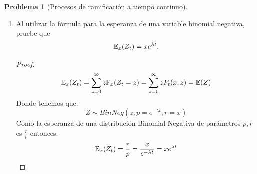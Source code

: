 \documentclass[a5paper,oneside]{amsart}
\theoremstyle{plain}
\theoremstyle{definition}
\newtheorem{problema}{Problema}
\begin{document}
\begin{problema}[Procesos de ramificaci\'on a tiempo continuo]
\begin{enumerate}
\begin{proof}
$$
e^{\lambda xt}P_t(x,x+1)=\int_0^t\lambda x e^{-\lambda s}ds=x(1-e^{\lambda t})$$
De donde encontramos que:
$$
P_t(x,x+1)=xe^{-\lambda xt}(1-e^{\lambda t})=\binom{x}{1} e^{-\lambda x t}\paren{1-e^{-\lambda t}}^{x+1-x}
$$
Por lo tanto la igualdad es v\'alida para $k=1$, ahora supongamos valida para $y=x+k$ y la demostraremos para $y=x+k+1$
$$
\frac{d}{dt}\imf{P_t}{x,x+k+1}=\lambda x P_t(x+1,x+k+1)-\lambda x P_t(x,x+k+1)
$$
Por la hip\'otesis de inducci\'on:
$$
P_t(x+1,x+k+1)=P_t((x+1),(x+1)+k)=\binom{x+k}{k} e^{-\lambda (x+1) t}\paren{1-e^{-\lambda t}}^{k}.
$$
Entonces:
$$
\frac{d}{dt}\imf{P_t}{x,x+k+1}=\lambda x \binom{x+k}{k} e^{-\lambda (x+1) t}\paren{1-e^{-\lambda t}}^{k}-\lambda x P_t(x,x+k+1)
$$
Nuevamente haciendo uso de la t\'ecnica del factor integrante (multiplicamos por $e^{\lambda xt}$) obtenemos la siguiente ecuaci\'on diferencial:
$$
\frac{d}{dt}\paren{e^{\lambda xt} \imf{P_t}{x,x+k+1}}=\lambda x \binom{x+k}{k} e^{-\lambda t}\paren{1-e^{-\lambda t}}^{k}
$$
Resolviendo la ecuaci\'on integrando 
$$
\paren{e^{\lambda xt} \imf{P_t}{x,x+k+1}}=\int_0^t\lambda x \binom{x+k}{k} e^{-\lambda s}\paren{1-e^{-\lambda s}}^{k}ds
$$
Obtenemos:
$$
\imf{P_t}{x,x+k+1}=\frac{x}{k+1}\binom{x+k}{k}e^{-\lambda xt} \paren{1-e^{-\lambda t}}^{k+1}
$$
Finalmente como:
$$
\frac{x}{k+1}\binom{x+k}{k}=\frac{x(x+k)!}{(k+1)x!k!}=\frac{(x+k)!}{(x-1)!(k+1)!}=\binom{x+k}{k+1}
$$
Obtenemos que la form\'ula es valida para $k+1$, pues:
$$
\imf{P_t}{x,x+k+1}=\binom{x+k}{k+1}e^{-\lambda xt} \paren{1-e^{-\lambda t}}^{k+1}
$$
Luego entonces es valida la soluci\'on a la ecuaci\'on kolmogorov para todo $y\geq x$. Es decir:
$$
\imf{P_t}{x,y}=\binom{y-1}{y-x} e^{-\lambda x t}\paren{1-e^{-\lambda t}}^{y-x}
$$
Observaci\'on: Notamos que $P_t(x,y)$ tiene distribuci\'on Binomial Negativa de par\'ametros $p=e^{-\lambda t}, r=x$. Entonces si suponemos que 
$$Z\sim BinNeg(z; p=e^{-\lambda t},r=x)$$
Entonces:
$$
P_t(x,y)=\p(Z=y-x)
$$
\end{proof}
\item Al utilizar la f\'ormula para la esperanza de una variable binomial negativa, pruebe que
$$
\mathbb{E}_x\!\left( Z_t\right) = xe^{\lambda t}.
$$
\begin{proof}
$$
\mathbb{E}_x\!\left( Z_t\right) =\sum_{z=0}^{\infty}z \mathbb{P} _x(Z_t=z)=\sum_{z=0}^{\infty}zP_t(x,z)=\mathbb{E}\! \left( Z \right)
$$
Donde tenemos que:
$$
Z\sim BinNeg(z; p=e^{-\lambda t},r=x)
$$
Como la esperanza de una distribuci\'on Binomial Negativa de par\'ametros $p,r$ es $\frac{r}{p}$ entonces:
$$
\mathbb{E}_x\!\left( Z_t\right) =\frac{r}{p}=\frac{x}{e^{-\lambda t}}=xe^{\lambda t}
$$ 
\end{proof}

\end{enumerate}
\end{problema}
\end{document}
